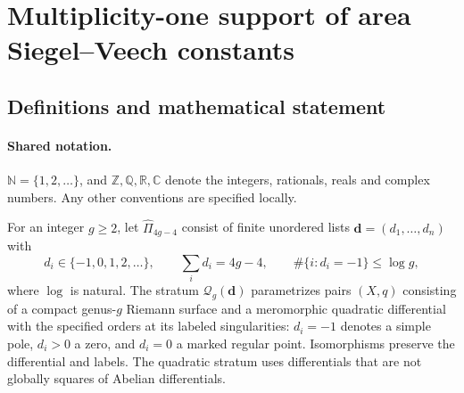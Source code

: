 \documentclass[11pt]{article}
\begin{document}
\section{Multiplicity-one support of area Siegel–Veech constants}\label{statement}

\subsection{Definitions and mathematical statement}

\paragraph{Shared notation.}$\mathbb N=\{1,2,\ldots\}$, and $\mathbb Z,\mathbb Q,\mathbb R,\mathbb C$ denote the integers, rationals, reals and complex numbers. Any other conventions are specified locally.


For an integer $g\ge2$, let $\widehat\Pi_{4g-4}$ consist of finite unordered lists $\boldsymbol d=(d_1,\ldots,d_n)$ with
\[
 d_i\in\{-1,0,1,2,\ldots\},\qquad\sum_i d_i=4g-4,\qquad
 \#\{i:d_i=-1\}\le\log g,
\]
where $\log$ is natural. The stratum $\mathcal Q_g(\boldsymbol d)$ parametrizes pairs $(X,q)$ consisting of a compact genus-$g$ Riemann surface and a meromorphic quadratic differential with the specified orders at its labeled singularities: $d_i=-1$ denotes a simple pole, $d_i>0$ a zero, and $d_i=0$ a marked regular point. Isomorphisms preserve the differential and labels. The quadratic stratum uses differentials that are not globally squares of Abelian differentials.
\end{document}
